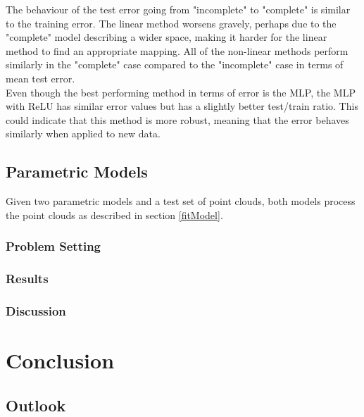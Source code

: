 The behaviour of the test error going from "incomplete" to "complete" is similar to the training error. The linear method worsens gravely, perhaps due to the "complete" model describing a wider space, making it harder for the linear method to find an appropriate mapping. All of the non-linear methods perform similarly in the "complete" case compared to the "incomplete" case in terms of mean test error.\\

Even though the best performing method in terms of error is the MLP, the MLP with ReLU has similar error values but has a slightly better test/train ratio. This could indicate that this method is more robust, meaning that the error behaves similarly when applied to new data.

\section{Parametric Models}
Given two parametric models and a test set of point clouds, both models process the point clouds as described in section \ref{fitModel}.
\subsection{Problem Setting}
\subsection{Results}
\subsection{Discussion}

\chapter{Conclusion}

\section{Outlook}
